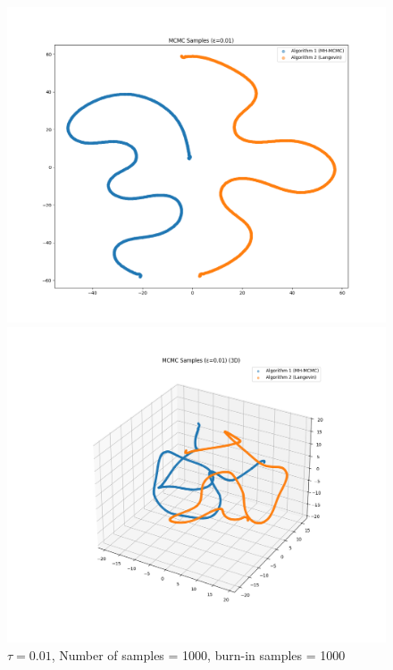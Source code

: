 \documentclass[a4paper,12pt]{article}
\begin{document}
\begin{figure}[H]
  \centering
  \begin{minipage}{0.38\textwidth}
    \includegraphics[width=\linewidth]{TASK-0-1/images/samples_eps0.01_n1000_burn1000_tsne_2d.png}
  \end{minipage}
  \hfill
  \begin{minipage}{0.38\textwidth}
    \includegraphics[width=\linewidth]{TASK-0-1/images/samples_eps0.01_n1000_burn1000_tsne_3d.png}
  \end{minipage}
  \caption{$\tau = 0.01$, Number of samples = 1000, burn-in samples = 1000}
\end{figure}
\end{document}
